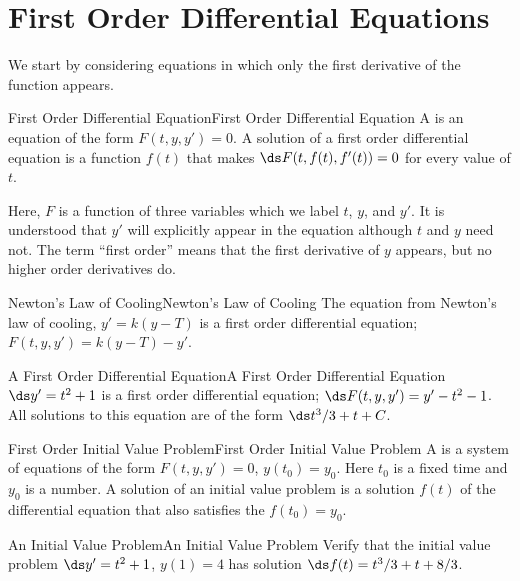 \section{First Order Differential Equations}\label{sec:first order differential equations}
We start by considering equations in which only the first derivative
of the function appears. 

\begin{definition}{First Order Differential Equation}{First Order Differential Equation}\label{First Order Differential Equation}
A  is an equation of
the form $F(t, y, y')=0$.
A solution of a first order differential equation is a
function $f(t)$ that makes $\ds F(t,f(t),f'(t))=0$ for every value of $t$.
\end{definition}

Here, $F$ is a function of three
variables which we label $t$, $y$, and $y'$. It is understood
that $y' $ will explicitly appear in the equation although $t$
and $y$ need not. The term ``first order'' means that the first
derivative of $y$ appears, but no higher order derivatives do.

\begin{example}{Newton's Law of Cooling}{Newton's Law of Cooling}\label{Newton's Law of Cooling}
 The equation from Newton's law of cooling,
$y'=k(y-T)$ is a first order
differential equation; $F(t,y,y')=k(y-T)-y'$.
\end{example}

\begin{example}{A First Order Differential Equation}{A First Order Differential Equation}\label{A First Order Differential Equation}
 $\ds y'=t^2+1$ is a first order differential
equation; $\ds F(t,y,y')= y'-t^2-1$. All solutions to this
equation are of the form $\ds t^3/3+t+C$. 
\end{example}

\begin{definition}{First Order Initial Value Problem}{First Order Initial Value Problem}\label{First Order Initial Value Problem}
A  is a system of
equations of the form
$F(t, y, y')=0$, $y(t_0)=y_0$. Here $t_0 $ is a fixed time
and $y_0$ is a number.
A solution of an initial value problem is a solution $f(t)$ of
the differential equation that also satisfies the 
 $f(t_0) = y_0$.
\end{definition}

\begin{example}{An Initial Value Problem}{An Initial Value Problem}\label{An Initial Value Problem}
Verify that the initial value problem $\ds y'=t^2+1$, $y(1)=4$
has solution $\ds f(t)=t^3/3+t+8/3$.
\end{example}

